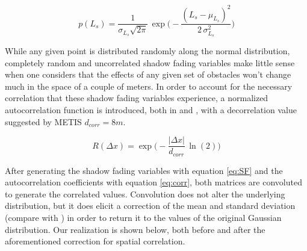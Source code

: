 \begin{equation} \label{eq:SF}
p(L_s) = \frac{1}{{\sigma_{L_s} \sqrt {2\pi } }}\,\exp\bigg(-\frac{(L_s - \mu_{L_s})^2}{2\,\sigma_{L_s}^2}\bigg)
\end{equation}

While any given point is distributed randomly along the normal distribution, completely random and uncorrelated shadow fading variables make little sense when one considers that the effects of any given set of obstacles won't change much in the space of a couple of meters. In order to account for the necessary correlation that these shadow fading variables experience, a normalized autocorrelation function is introduced, both in \cite{Forkel2004} and \cite{Raschkowski}, with a decorrelation value suggested by METIS $d_{corr} = 8 m$.

\begin{equation} \label{eq:corr}
R(\Delta x) = \exp\bigg(-\frac{|\Delta x|}{d_{corr}}\,\ln(2)\bigg)
\end{equation}

After generating the shadow fading variables with equation \ref{eq:SF} and the autocorrelation coefficients with equation \ref{eq:corr}, both matrices are convoluted to generate the correlated values. Convolution does not alter the underlying distribution, but it does elicit a correction of the mean and standard deviation (compare with \cite{Forkel2004}) in order to return it to the values of the original Gaussian distribution. Our realization is shown below, both before and after the aforementioned correction for spatial correlation.

